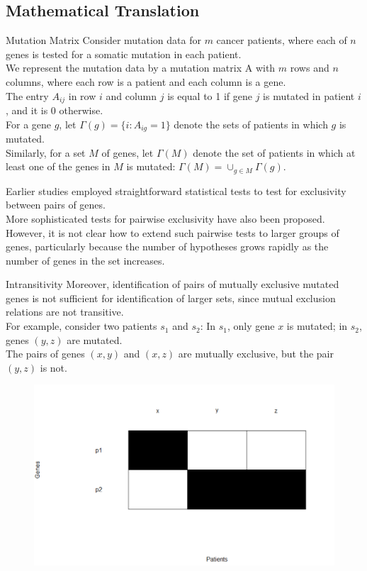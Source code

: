 \documentclass[xcolor=dvipsnames]{beamer}
\begin{document}
\subsection{Mathematical Translation}
\begin{frame}{Mutation Matrix}
Consider mutation data for $m$ cancer patients, where each of $n$ genes is tested for a somatic mutation in each patient.\\
We represent the mutation data by a mutation matrix A with $m$ rows and $n$ columns, where each row is a patient and each column is a gene.\\
The entry $A_{ij}$ in row $i$ and column $j$ is equal to 1 if gene $j$ is mutated in patient $i$, and it is 0 otherwise.\\
For a gene $g$, let $\Gamma(g)=\{i:A_{ig}=1\}$ denote the sets of patients in which $g$ is mutated.\\
Similarly, for a set $M$ of genes, let $\Gamma(M)$ denote the set of patients in which at least one of the genes in $M$ is mutated: $\Gamma(M)=\cup_{g\in M}\Gamma(g)$.\\
\end{frame}
\begin{frame}
Earlier studies employed straightforward statistical tests to test for exclusivity between pairs of genes.\\
More sophisticated tests for pairwise exclusivity have also been proposed.\\
However, it is not clear how to extend such pairwise tests to larger groups of genes, particularly because the number of hypotheses grows rapidly as the number of genes in the set increases.\\
\end{frame}
\begin{frame}{Intransitivity}
Moreover, identification of pairs of mutually exclusive mutated genes is not sufficient for identification of larger sets, since mutual exclusion relations are not transitive.\\
For example, consider two patients $s_1$ and $s_2$: In $s_1$, only gene $x$ is mutated; in $s_2$, genes $(y,z)$ are mutated.\\
The pairs of genes $(x,y)$ and $(x,z)$ are mutually exclusive, but the pair $(y,z)$ is not.\\
\begin{figure}
\centering
\includegraphics[width=0.6\linewidth]{pg.png}
\end{figure}
\end{frame}
\end{document}
